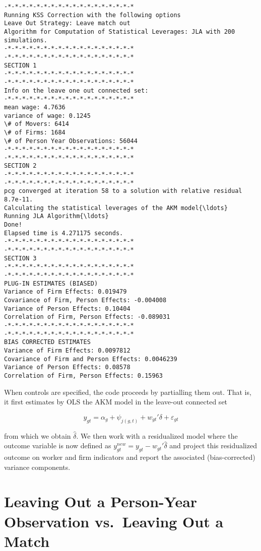 \documentclass[11pt]{article}
\begin{document}
    \begin{Verbatim}[commandchars=\\\{\}]
-*-*-*-*-*-*-*-*-*-*-*-*-*-*-*-*-*-*
Running KSS Correction with the following options
Leave Out Strategy: Leave match out
Algorithm for Computation of Statistical Leverages: JLA with 200 simulations.
-*-*-*-*-*-*-*-*-*-*-*-*-*-*-*-*-*-*
-*-*-*-*-*-*-*-*-*-*-*-*-*-*-*-*-*-*
SECTION 1
-*-*-*-*-*-*-*-*-*-*-*-*-*-*-*-*-*-*
-*-*-*-*-*-*-*-*-*-*-*-*-*-*-*-*-*-*
Info on the leave one out connected set:
-*-*-*-*-*-*-*-*-*-*-*-*-*-*-*-*-*-*
mean wage: 4.7636
variance of wage: 0.1245
\# of Movers: 6414
\# of Firms: 1684
\# of Person Year Observations: 56044
-*-*-*-*-*-*-*-*-*-*-*-*-*-*-*-*-*-*
-*-*-*-*-*-*-*-*-*-*-*-*-*-*-*-*-*-*
SECTION 2
-*-*-*-*-*-*-*-*-*-*-*-*-*-*-*-*-*-*
-*-*-*-*-*-*-*-*-*-*-*-*-*-*-*-*-*-*
pcg converged at iteration 58 to a solution with relative residual 8.7e-11.
Calculating the statistical leverages of the AKM model{\ldots}
Running JLA Algorithm{\ldots}
Done!
Elapsed time is 4.271175 seconds.
-*-*-*-*-*-*-*-*-*-*-*-*-*-*-*-*-*-*
-*-*-*-*-*-*-*-*-*-*-*-*-*-*-*-*-*-*
SECTION 3
-*-*-*-*-*-*-*-*-*-*-*-*-*-*-*-*-*-*
-*-*-*-*-*-*-*-*-*-*-*-*-*-*-*-*-*-*
PLUG-IN ESTIMATES (BIASED)
Variance of Firm Effects: 0.019479
Covariance of Firm, Person Effects: -0.004008
Variance of Person Effects: 0.10404
Correlation of Firm, Person Effects: -0.089031
-*-*-*-*-*-*-*-*-*-*-*-*-*-*-*-*-*-*
-*-*-*-*-*-*-*-*-*-*-*-*-*-*-*-*-*-*
BIAS CORRECTED ESTIMATES
Variance of Firm Effects: 0.0097812
Covariance of Firm and Person Effects: 0.0046239
Variance of Person Effects: 0.08578
Correlation of Firm, Person Effects: 0.15963
    \end{Verbatim}

    When controls are specified, the code proceeds by partialling them out.
That is, it first estimates by OLS the AKM model in the leave-out connected set

\begin{equation}
y_{gt}=\alpha_{g}+\psi_{j(g,t)}+w_{gt}'\delta+\varepsilon_{gt}
\end{equation}

from which we obtain \(\hat{\delta}\). We then work with a residualized
model where the outcome variable is now defined as
\(y_{gt}^{new}=y_{gt}-w_{gt}'\hat{\delta}\) and project this
residualized outcome on worker and firm indicators and report the
associated (bias-corrected) variance components.

\section{Leaving Out a Person-Year Observation vs.~Leaving Out a
Match}
\label{sec:leave_out_level}
\end{document}
